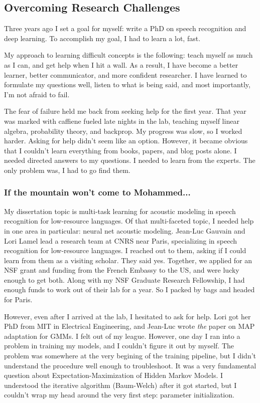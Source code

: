 \documentclass[12pt,a4paper]{article}
\begin{document}
\subsection*{Overcoming Research Challenges}

Three years ago I set a goal for myself: write a PhD on speech recognition and deep learning. To accomplish my goal, I had to learn a lot, fast.

My approach to learning difficult concepts is the following: teach myself as much as I can, and get help when I hit a wall. As a result, I have become a better learner, better communicator, and more confident researcher. I have learned to formulate my questions well, listen to what is being said, and most importantly, I'm not afraid to fail.

The fear of failure held me back from seeking help for the first year. That year was marked with caffiene fueled late nights in the lab, teaching myself linear algebra, probability theory, and backprop. My progress was slow, so I worked harder. Asking for help didn't seem like an option. However, it became obvious that I couldn't learn everything from books, papers, and blog posts alone. I needed directed answers to my questions. I needed to learn from the experts. The only problem was, I had to go find them.

\subsubsection*{If the mountain won't come to Mohammed...}

My dissertation topic is multi-task learning for acoustic modeling in speech recognition for low-resource languages. Of that multi-faceted topic, I needed help in one area in particular: neural net acoustic modeling. Jean-Luc Gauvain and Lori Lamel lead a research team at CNRS near Paris, specializing in speech recognition for low-resource languages. I reached out to them, asking if I could learn from them as a visiting scholar. They said yes. Together, we applied for an NSF grant and funding from the French Embassy to the US, and were lucky enough to get both. Along with my NSF Graduate Research Fellowship, I had enough funds to work out of their lab for a year. So I packed by bags and headed for Paris.

However, even after I arrived at the lab, I hesitated to ask for help. Lori got her PhD from MIT in Electrical Engineering, and Jean-Luc wrote \textit{the} paper on MAP adaptation for GMMs. I felt out of my league. However, one day I ran into a problem in training my models, and I couldn't figure it out by myself. The problem was somewhere at the very begining of the training pipeline, but I didn't understand the procedure well enough to troubleshoot. It was a very fundamental question about Expectation-Maximization of Hidden Markov Models. I understood the iterative algorithm (Baum-Welch) after it got started, but I couldn't wrap my head around the very first step: parameter initialization.
\end{document}
